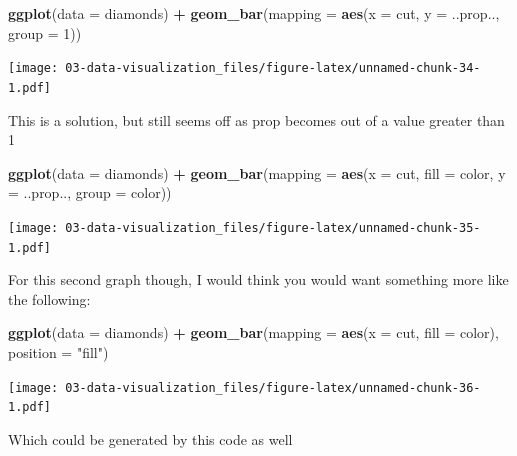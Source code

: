 \documentclass[]{book}
\newenvironment{Shaded}{\begin{snugshade}}{\end{snugshade}}
\newcommand{\DataTypeTok}[1]{\textcolor[rgb]{0.13,0.29,0.53}{#1}}
\newcommand{\DecValTok}[1]{\textcolor[rgb]{0.00,0.00,0.81}{#1}}
\newcommand{\KeywordTok}[1]{\textcolor[rgb]{0.13,0.29,0.53}{\textbf{#1}}}
\newcommand{\NormalTok}[1]{#1}
\newcommand{\OperatorTok}[1]{\textcolor[rgb]{0.81,0.36,0.00}{\textbf{#1}}}
\newcommand{\StringTok}[1]{\textcolor[rgb]{0.31,0.60,0.02}{#1}}
\theoremstyle{definition}
\theoremstyle{definition}
\theoremstyle{definition}
\theoremstyle{remark}
\begin{document}
\begin{Shaded}
\begin{Highlighting}[]
\KeywordTok{ggplot}\NormalTok{(}\DataTypeTok{data =}\NormalTok{ diamonds) }\OperatorTok{+}\StringTok{ }
\StringTok{  }\KeywordTok{geom_bar}\NormalTok{(}\DataTypeTok{mapping =} \KeywordTok{aes}\NormalTok{(}\DataTypeTok{x =}\NormalTok{ cut, }\DataTypeTok{y =}\NormalTok{ ..prop.., }\DataTypeTok{group =} \DecValTok{1}\NormalTok{))}
\end{Highlighting}
\end{Shaded}

\texttt{[image: 03-data-visualization\_files/figure-latex/unnamed-chunk-34-1.pdf]}

This is a solution, but still seems off as prop becomes out of a value
greater than 1

\begin{Shaded}
\begin{Highlighting}[]
\KeywordTok{ggplot}\NormalTok{(}\DataTypeTok{data =}\NormalTok{ diamonds) }\OperatorTok{+}\StringTok{ }
\StringTok{  }\KeywordTok{geom_bar}\NormalTok{(}\DataTypeTok{mapping =} \KeywordTok{aes}\NormalTok{(}\DataTypeTok{x =}\NormalTok{ cut, }\DataTypeTok{fill =}\NormalTok{ color, }\DataTypeTok{y =}\NormalTok{ ..prop.., }\DataTypeTok{group =}\NormalTok{ color))}
\end{Highlighting}
\end{Shaded}

\texttt{[image: 03-data-visualization\_files/figure-latex/unnamed-chunk-35-1.pdf]}

For this second graph though, I would think you would want something
more like the following:

\begin{Shaded}
\begin{Highlighting}[]
\KeywordTok{ggplot}\NormalTok{(}\DataTypeTok{data =}\NormalTok{ diamonds) }\OperatorTok{+}\StringTok{ }
\StringTok{  }\KeywordTok{geom_bar}\NormalTok{(}\DataTypeTok{mapping =} \KeywordTok{aes}\NormalTok{(}\DataTypeTok{x =}\NormalTok{ cut, }\DataTypeTok{fill =}\NormalTok{ color), }\DataTypeTok{position =} \StringTok{"fill"}\NormalTok{)}
\end{Highlighting}
\end{Shaded}

\texttt{[image: 03-data-visualization\_files/figure-latex/unnamed-chunk-36-1.pdf]}

Which could be generated by this code as well
\end{document}
